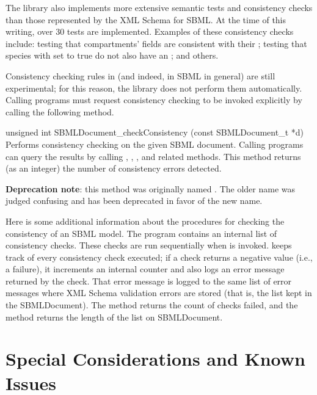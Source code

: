 \documentclass{sbmlmanual}
\begin{document}
The \libsbml{} library also implements more extensive semantic tests and
consistency checks than those represented by the XML Schema for SBML.  At
the time of this writing, over 30 tests are implemented.  Examples of these
consistency checks include: testing that compartments'
 fields are consistent with their
; testing that species with
 set to true do not also have an
; and others.
    
Consistency checking rules in \libsbml{} (and indeed, in SBML in general)
are still experimental; for this reason, the library does not perform them
automatically.  Calling programs must request consistency checking to be
invoked explicitly by calling the following method.

\begin{methoddef}{unsigned int SBMLDocument\_checkConsistency (const SBMLDocument\_t *d)}
  Performs consistency checking on the given SBML document.  Calling programs can query
  the results by calling ,
  ,
  , and related methods.  This method
  returns (as an integer) the number of consistency errors
  detected.

  \textbf{Deprecation note}: this method was originally named
  .  The older name was judged confusing
  and has been deprecated in favor of the new name.
\end{methoddef}

Here is some additional information about the \libsbml{} procedures for
checking the consistency of an SBML model.  The program contains an
internal list of consistency checks.  These checks are run sequentially
when  is invoked.  \libsbml{}
keeps track of every consistency check executed; if a check returns a
negative value (i.e., a failure), it increments an internal counter and
also logs an error message returned by the check.  That error message is
logged to the same list of error messages where XML Schema validation
errors are stored (that is, the list kept in the SBMLDocument).  The method
 returns the count of checks
failed, and the method  returns the
length of the list on SBMLDocument.


\section{Special Considerations and Known Issues}
\label{sec:special-considerations}
\end{document}
